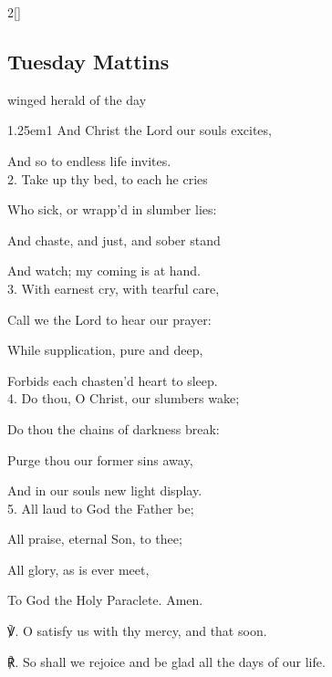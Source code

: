 \begin{paracol}{2}[]
\sloppy

\subsection{Tuesday Mattins}\label{TuesdayMattins}

 winged herald of the day


\begin{hangparas}{1.25em}{1}
And Christ the Lord our souls excites,

And so to endless life invites.\\

2. Take up thy bed, to each he cries

Who sick, or wrapp'd in slumber lies:

And chaste, and just, and sober stand

And watch; my coming is at hand.\\

3. With earnest cry, with tearful care,

Call we the Lord to hear our prayer:

While supplication, pure and deep,

Forbids each chasten'd heart to sleep.\\

4. Do thou, O Christ, our slumbers wake;

Do thou the chains of darkness break:

Purge thou our former sins away,

And in our souls new light display.\\

5. All laud to God the Father be;

All praise, eternal Son, to thee;

All glory, as is ever meet,

To God the Holy Paraclete. Amen.\\
\end{hangparas}

℣. O satisfy us with thy mercy, and that soon.

℟. So shall we rejoice and be glad all the days of our life.



\end{paracol}
